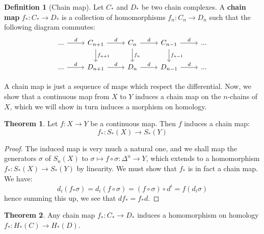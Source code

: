 \documentclass[11pt, oneside]{amsart}   	%
\theoremstyle{definition}
\newtheorem{definition}{Definition}[section]
\newtheorem{theorem}{Theorem}[section]
\begin{document}
\begin{definition}[Chain map]
	Let $C_*$ and $D_*$ be two chain complexes. A \textbf{chain map} $f_* : C_*\rightarrow D_*$ is a collection of 
	homomorphisms $f_n : C_n\rightarrow D_n$ such that the following diagram commutes:
	\begin{equation}\begin{tikzcd}
	...\arrow[r, "d"] & C_{n + 1}\arrow[d, "f_{n + 1}"]\arrow[r, "d"] & C_n\arrow[d, "f_n"]\arrow[r, "d"] & C_{n - 1}\arrow[d, 
	"f_{n - 1}"]\arrow[r, "d"] & ... \\
	...\arrow[r, "d"] & D_{n + 1}\arrow[r, "d"] & D_n\arrow[r, "d"] & D_{n - 1}\arrow[r, "d"] & ...
	\end{tikzcd}\end{equation}
\end{definition}

A chain map is just a sequence of maps which respect the differential. Now, we show that a continuous map from $X$ to $Y$ 
induces a chain map on the $n$-chains of $X$, which we will show in turn induces a morphism on homology. 

\begin{theorem}
	Let $f : X\rightarrow Y$ be a continuous map. Then $f$ induces a chain map:
	\begin{equation}
		f_* : S_*(X)\rightarrow S_*(Y)
	\end{equation}
\end{theorem}

\begin{proof}
	The induced map is very much a natural one, and we shall map the generators $\sigma$ of $S_n(X)$ to $\sigma\mapsto 
	f\circ\sigma : \Delta^n\rightarrow Y$, which extends to a homomorphism $f_* : S_*(X)\rightarrow S_*(Y)$ by linearity. We 
	must show that $f_*$ is in fact a chain map. We have:
	\begin{equation}
		d_i (f_*\sigma) = d_i (f\circ\sigma) = (f\circ\sigma)\circ d^i = f(d_i\sigma)
	\end{equation}
	hence summing this up, we see that $df_* = f_*d$. 
\end{proof}

\begin{theorem}
	Any chain map $f_* : C_*\rightarrow D_*$ induces a homomorphism on homology $f_* : H_*(C)\rightarrow H_*(D)$. 
\end{theorem}
\end{document}
